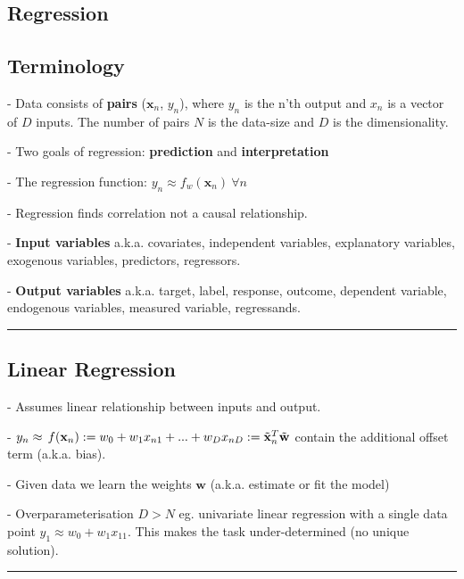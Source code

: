 \documentclass[10pt]{article}
\begin{document}
\begin{multicols*}{4}

\section{Regression}
\subsection{Terminology}

- Data consists of \textbf{pairs} ($\mathbf{x}_n$, $y_n$), where $y_n$ is the n’th output and $x_n$ is a vector of $D$ inputs. The number of pairs $N$ is the data-size and $D$ is the dimensionality.

- Two goals of regression: \textbf{prediction} and \textbf{interpretation}

- The regression function: $y_{n}\approx f_w(\mathbf{x}_{n})\ \forall n$

- Regression finds correlation not a causal relationship.

- \textbf{Input variables} a.k.a. covariates, independent variables, explanatory variables, exogenous variables, predictors, regressors. 

- \textbf{Output variables} a.k.a. target, label, response, outcome, dependent variable, endogenous variables, measured variable, regressands.

\vspace{4pt}
\hrule
\vspace{4pt}
\subsection{Linear Regression}

- Assumes linear relationship between inputs and output.

- $y_{n}\approx\,f(\mathbf{x}_{n}) :=w_{0}+w_{1}x_{n1}+ ... +w_{D}x_{n D} \\ := \tilde{\bf x}_{n}^{T} \tilde{\bf w}$ contain the additional offset term (\small{a.k.a. bias}).

- Given data we learn the weights $\mathbf{w}$ (\small{a.k.a. estimate or fit the model})

- Overparameterisation $D > N$ eg. univariate linear regression with a single data point $y_{1}\approx w_{0}+w_{1}x_{11}$. This makes the task under-determined (no unique solution).

\vspace{4pt}
\hrule
\vspace{4pt}

\end{multicols*}
\end{document}
